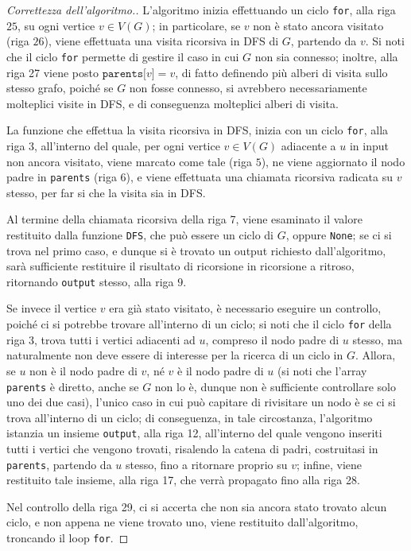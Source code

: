 \documentclass[a4paper, 12pt]{report}
\begin{document}
    \begin{proof}[Correttezza dell'algoritmo.]
        L'algoritmo inizia effettuando un ciclo \texttt{for}, alla riga $25$, su ogni vertice $v \in V(G)$; in particolare, se $v$ non è stato ancora visitato (riga $26$), viene effettuata una visita ricorsiva in DFS di $G$, partendo da $v$. Si noti che il ciclo \texttt{for} permette di gestire il caso in cui $G$ non sia connesso; inoltre, alla riga 27 viene posto $\texttt{parents[}v\texttt{]} = v$, di fatto definendo più alberi di visita sullo stesso grafo, poiché se $G$ non fosse connesso, si avrebbero necessariamente molteplici visite in DFS, e di conseguenza molteplici alberi di visita.

        La funzione che effettua la visita ricorsiva in DFS, inizia con un ciclo \texttt{for}, alla riga $3$, all'interno del quale, per ogni vertice $v \in V(G)$ adiacente a $u$ in input non ancora visitato, viene marcato come tale (riga $5$), ne viene aggiornato il nodo padre in \texttt{parents} (riga $6$), e viene effettuata una chiamata ricorsiva radicata su $v$ stesso, per far si che la visita sia in DFS.

        Al termine della chiamata ricorsiva della riga 7, viene esaminato il valore restituito dalla funzione \texttt{DFS}, che può essere un ciclo di $G$, oppure \texttt{None}; se ci si trova nel primo caso, e dunque si è trovato un output richiesto dall'algoritmo, sarà sufficiente restituire il risultato di ricorsione in ricorsione a ritroso, ritornando \texttt{output} stesso, alla riga $9$.

        Se invece il vertice $v$ era già stato visitato, è necessario eseguire un controllo, poiché ci si potrebbe trovare all'interno di un ciclo; si noti che il ciclo \texttt{for} della riga 3, trova tutti i vertici adiacenti ad $u$, compreso il nodo padre di $u$ stesso, ma naturalmente non deve essere di interesse per la ricerca di un ciclo in $G$. Allora, se $u$ non è il nodo padre di $v$, né $v$ è il nodo padre di $u$ (si noti che l'array \texttt{parents} è diretto, anche se $G$ non lo è, dunque non è sufficiente controllare solo uno dei due casi), l'unico caso in cui può capitare di rivisitare un nodo è se ci si trova all'interno di un ciclo; di conseguenza, in tale circostanza, l'algoritmo istanzia un insieme \texttt{output}, alla riga 12, all'interno del quale vengono inseriti tutti i vertici che vengono trovati, risalendo la catena di padri, costruitasi in \texttt{parents}, partendo da $u$ stesso, fino a ritornare proprio su $v$; infine, viene restituito tale insieme, alla riga 17, che verrà propagato fino alla riga 28.

        Nel controllo della riga 29, ci si accerta che non sia ancora stato trovato alcun ciclo, e non appena ne viene trovato uno, viene restituito dall'algoritmo, troncando il loop \texttt{for}.
    \end{proof}
\end{document}
